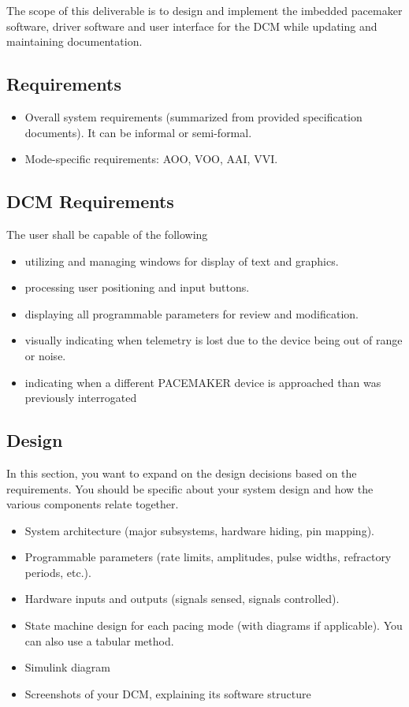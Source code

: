 \documentclass{article}
\begin{document}
The scope of this deliverable is to design and implement the imbedded pacemaker software, driver software and user interface for 
the DCM while updating and maintaining documentation. 



\subsection{Requirements}

\begin{itemize}
    \item Overall system requirements (summarized from provided specification documents). It can be informal or semi-formal.
    \item Mode-specific requirements: AOO, VOO, AAI, VVI.
\end{itemize}

\subsection{DCM Requirements}
The user shall be capable of the following
\begin{itemize}
    \item utilizing and managing windows for display of text and graphics.
    \item processing user positioning and input buttons.
    \item displaying all programmable parameters for review and modification.
    \item visually indicating when telemetry is lost due to the device being out of range or noise.
    \item indicating when a different PACEMAKER device is approached than was previously interrogated
\end{itemize}

\subsection{Design}

In this section, you want to expand on the design decisions based on the requirements. You should be specific about your system design and how the various components relate together.

\begin{itemize}
    \item System architecture (major subsystems, hardware hiding, pin mapping).
    \item Programmable parameters (rate limits, amplitudes, pulse widths, refractory periods, etc.).
    \item Hardware inputs and outputs (signals sensed, signals controlled).
    \item State machine design for each pacing mode (with diagrams if applicable). You can also use a tabular method.
    \item Simulink diagram
    \item Screenshots of your DCM, explaining its software structure
\end{itemize}
\end{document}
